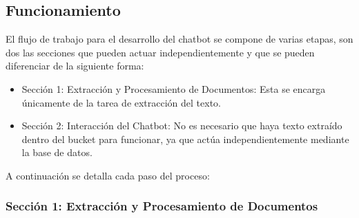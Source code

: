\subsection{Funcionamiento}\label{funcionamiento-gcp}
El flujo de trabajo para el desarrollo del chatbot se compone de varias etapas, son dos las secciones que pueden actuar independientemente y que se pueden diferenciar de la siguiente forma:  

\begin{itemize}
    \item Sección 1: Extracción y Procesamiento de Documentos: Esta se encarga únicamente de la tarea de extracción del texto.
    \item Sección 2: Interacción del Chatbot: No es necesario que haya texto extraído dentro del bucket para funcionar, ya que actúa independientemente mediante la base de datos. 
\end{itemize}

A continuación se detalla cada paso del proceso:

\subsubsection{Sección 1: Extracción y Procesamiento de Documentos}

